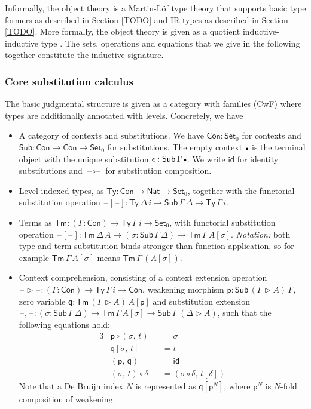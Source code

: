 \documentclass[acmsmall,screen,review,anonymous]{acmart}
\newcommand{\msf}[1]{{\mathsf{#1}}}
\newcommand{\p}{\mathsf{p}}
\newcommand{\q}{\mathsf{q}}
\newcommand{\Set}{\msf{Set}}
\newcommand{\Nat}{\msf{Nat}}
\newcommand{\blank}{{\mathord{\hspace{1pt}\text{--}\hspace{1pt}}}}
\newcommand{\emptycon}{\scaleobj{.75}\bullet}
\newcommand{\id}{\msf{id}}
\newcommand{\Con}{\msf{Con}}
\newcommand{\Sub}{\msf{Sub}}
\newcommand{\Ty}{\msf{Ty}}
\newcommand{\Tm}{\msf{Tm}}
\newcommand{\ext}{\triangleright}
\begin{document}
Informally, the object theory is a Martin-Löf type theory that supports basic type formers as
described in Section \ref{TODO} and IR types as described in Section \ref{TODO}. More formally, the
object theory is given as a quotient inductive-inductive type \cite{TODO}. The sets, operations and
equations that we give in the following together constitute the inductive signature.

\subsubsection{Core substitution calculus} The basic judgmental structure is given
as a category with families (CwF) \cite{TODO} where types are additionally annotated with levels.
Concretely, we have
\begin{itemize}
\item A category of contexts and substitutions. We have $\Con : \Set_0$ for contexts and $\Sub : \Con \to \Con \to \Set_0$
  for substitutions. The empty context $\emptycon$ is the terminal object with the unique substitution $\epsilon : \Sub\,\Gamma\,\emptycon$.
  We write $\id$ for identity substitutions and $\blank\!\circ\!\blank$ for substitution composition.
\item Level-indexed types, as $\Ty : \Con \to \Nat \to \Set_0$, together with the functorial substitution operation
      $\blank[\blank] : \Ty\,\Delta\,i \to \Sub\,\Gamma\,\Delta \to \Ty\,\Gamma\,i$.
\item Terms as $\Tm : (\Gamma : \Con) \to \Ty\,\Gamma\,i \to \Set_0$, with functorial substitution operation
  $\blank[\blank] : \Tm\,\Delta\,A \to (\sigma : \Sub\,\Gamma\,\Delta) \to \Tm\,\Gamma\,A[\sigma]$.
  \emph{Notation:} both type and term substitution binds stronger than function application, so
  for example $\Tm\,\Gamma\,A[\sigma]$ means $\Tm\,\Gamma\,(A[\sigma])$.
\item Context comprehension, consisting of a context extension operation $\blank\!\ext\!\blank : (\Gamma : \Con) \to \Ty\,\Gamma\,i \to \Con$,
  weakening morphism $\p : \Sub\,(\Gamma\ext A)\,\Gamma$, zero variable $\q : \Tm\,(\Gamma\ext A)\,A[\p]$ and substitution extension $\blank,\!\blank : (\sigma : \Sub\,\Gamma\,\Delta) \to \Tm\,\Gamma\,A[\sigma] \to \Sub\,\Gamma\,(\Delta\ext A)$, such that the following equations hold:
  \begin{alignat*}{3}
    &\p \circ (\sigma,\,t)     &&= \sigma \\
    &\q[\sigma,\,t]            &&= t \\
    &(\p,\,\q)                 &&= \id \\
    &(\sigma,\,t) \circ \delta &&= (\sigma \circ \delta,\,t[\delta])
  \end{alignat*}
  Note that a De Bruijn index $N$ is represented as $\q[\p^N]$, where $\p^N$ is $N$-fold composition
  of weakening.
\end{itemize}
\end{document}
